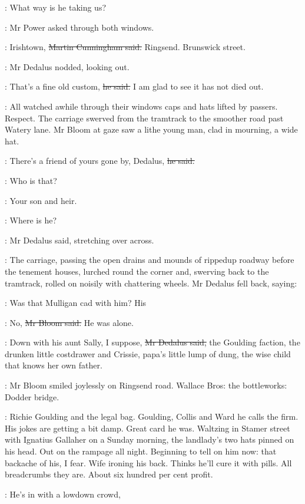 \power:
What way is he taking us?

:
Mr Power asked through both windows.

\cunningham:
Irishtown,
\sout{Martin Cunningham said.}
Ringsend.
Brunswick street.

:
Mr Dedalus nodded, looking out.

\Bloom:
That's a fine old custom,
\sout{he said.}
I am glad to see it has not died out.

:
All watched awhile through their windows
caps and hats lifted by passers.
Respect.
The carriage swerved from the tramtrack to the smoother road past Watery lane.
Mr Bloom at gaze saw a lithe young man,
clad in mourning, a wide hat.

\Bloom:
There's a friend of yours gone by, Dedalus,
\sout{he said.}

\simon:
Who is that?

\Bloom:
Your son and heir.

\simon:
Where is he?

:
Mr Dedalus said,
stretching over across.

:
The carriage, passing the open drains and mounds of rippedup roadway
before the tenement houses,
lurched round the corner
and, swerving back to the tramtrack, rolled on noisily with chattering wheels.
Mr Dedalus fell back, saying:

\simon:
Was that Mulligan cad with him?
His 

\Bloom:
No,
\sout{Mr Bloom said.}
He was alone.

\simon:
Down with his aunt Sally, I suppose,
\sout{Mr Dedalus said,}
the Goulding faction,
the drunken little costdrawer
and Crissie, papa's little lump of dung,
the wise child that knows her own father.

:
Mr Bloom smiled joylessly on Ringsend road.
Wallace Bros:
the bottleworks:
Dodder bridge.

\BloomInt:
Richie Goulding and the legal bag.
Goulding, Collis and Ward he calls the firm.
His jokes are getting a bit damp.
Great card he was.
Waltzing in Stamer street with Ignatius Gallaher on a Sunday morning,
the landlady's two hats pinned on his head.
Out on the rampage all night.
Beginning to tell on him now:
that backache of his, I fear.
Wife ironing his back.
Thinks he'll cure it with pills.
All breadcrumbs they are.
About six hundred per cent profit.

\simon:
He's in with a lowdown crowd,

